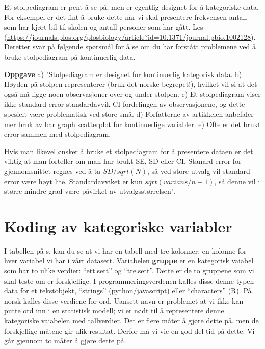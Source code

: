 \documentclass[
]{book}
\begin{document}
Et stolpediagram er pent å se på, men er egentlig designet for å kategoriske data. For eksempel er det fint å bruke dette når vi skal presentere frekvensen antall som har kjørt bil til skolen og antall personer som har gått. Les \citep{weissgerber_beyond_2015}(\url{https://journals.plos.org/plosbiology/article?id=10.1371/journal.pbio.1002128}). Deretter svar på følgende spørsmål for å se om du har forstått problemene ved å bruke stolpediagram på kontinuerlig data.

\textbf{Oppgave}
a) "Stolpediagram er designet for kontinuerlig kategorisk data.
b) Høyden på stolpen representerer (bruk det norske begrepet!), hvilket vil si at det også må ligge noen observasjoner over og under stolpen.
c) Et stolpediagram viser ikke standard error standardavvik CI fordelingen av observasjonene, og dette spesielt være problematisk ved store små.
d) Forfatterne av artikkelen anbefaler mer bruk av bar graph scatterplot for kontinuerlige variabler.
e) Ofte er det brukt error sammen med stolpediagram.

Hvis man likevel ønsker å bruke et stolpediagram for å presentere dataen er det viktig at man forteller om man har brukt SE, SD eller CI. Stanard error for gjennomsnittet regnes ved å ta \(SD/sqrt(N)\), så ved store utvalg vil standard error være høyt lite. Standardavviket er kun \(sqrt(varians/n-1)\), så denne vil i større mindre grad være påvirket av utvalgsstørrelsen".

\hypertarget{koding-av-kategoriske-variabler}{%
\chapter{Koding av kategoriske variabler}\label{koding-av-kategoriske-variabler}}

I tabellen på s. kan du se at vi har en tabell med tre kolonner: en kolonne for hver variabel vi har i vårt datasett. Variabelen \textbf{gruppe} er en kategorisk vaiabel som har to ulike verdier: ``ett.sett'' og ``tre.sett''. Dette er de to gruppene som vi skal teste om er forskjellige. I programmeringsverdenen kalles disse denne typen data for et tekstobjekt, ``strings'' (python/javascript) eller ``characters'' (R). På norsk kalles disse verdiene for ord. Uansett navn er problemet at vi ikke kan putte ord inn i en statistisk modell; vi er nødt til å representere denne kategoriske vaiabelen med tallverdier. Det er flere måter å gjøre dette på, men de forskjellige måtene gir ulik resultat. Derfor må vi vie en god del tid på dette. Vi går gjennom to måter å gjøre dette på.
\end{document}
